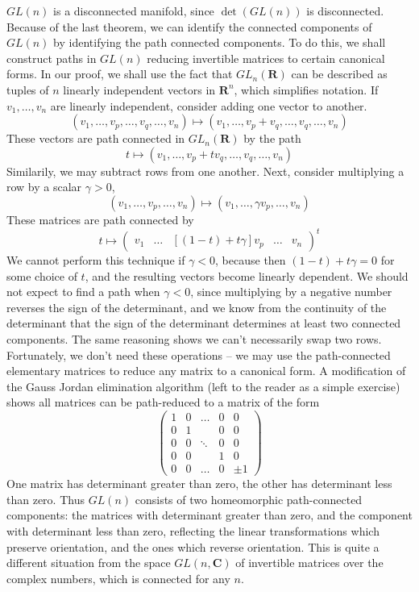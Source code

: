 \begin{example}
    $GL(n)$ is a disconnected manifold, since $\det(GL(n))$ is disconnected. Because of the last theorem, we can identify the connected components of $GL(n)$ by identifying the path connected components. To do this, we shall construct paths in $GL(n)$ reducing invertible matrices to certain canonical forms. In our proof, we shall use the fact that $GL_n(\mathbf{R})$ can be described as tuples of $n$ linearly independent vectors in $\mathbf{R}^n$, which simplifies notation. If $v_1, \dots, v_n$ are linearly independent, consider adding one vector to another.
    \[ (v_1, \dots, v_p, \dots, v_q, \dots, v_n) \mapsto (v_1, \dots, v_p + v_q, \dots, v_q, \dots, v_n) \]
    These vectors are path connected in $GL_n(\mathbf{R})$ by the path
    \[ t \mapsto (v_1, \dots, v_p + t v_q, \dots, v_q, \dots, v_n) \]
    Similarily, we may subtract rows from one another. Next, consider multiplying a row by a scalar $\gamma > 0$,
    \[ (v_1, \dots, v_p, \dots, v_n) \mapsto (v_1, \dots, \gamma v_p, \dots, v_n) \]
    These matrices are path connected by
    \[ t \mapsto \begin{pmatrix} v_1 & \dots & [(1-t) + t \gamma]v_p & \dots & v_n \end{pmatrix}^t \]
    We cannot perform this technique if $\gamma < 0$, because then $(1-t) + t \gamma = 0$ for some choice of $t$, and the resulting vectors become linearly dependent. We should not expect to find a path when $\gamma < 0$, since multiplying by a negative number reverses the sign of the determinant, and we know from the continuity of the determinant that the sign of the determinant determines at least two connected components. The same reasoning shows we can't necessarily swap two rows. Fortunately, we don't need these operations -- we may use the path-connected elementary matrices to reduce any matrix to a canonical form. A modification of the Gauss Jordan elimination algorithm (left to the reader as a simple exercise) shows all matrices can be path-reduced to a matrix of the form
    \[ \begin{pmatrix} 1 & 0 & \dots & 0 & 0 \\ 0 & 1 & & 0 & 0 \\ 0 & 0 & \ddots & 0 & 0 \\ 0 & 0 &  & 1 & 0 \\ 0 & 0 & \dots & 0 & \pm 1 \end{pmatrix} \]
    One matrix has determinant greater than zero, the other has determinant less than zero. Thus $GL(n)$ consists of two homeomorphic path-connected components: the matrices with determinant greater than zero, and the component with determinant less than zero, reflecting the linear transformations which preserve orientation, and the ones which reverse orientation. This is quite a different situation from the space $GL(n,\mathbf{C})$ of invertible matrices over the complex numbers, which is connected for any $n$.
\end{example}

